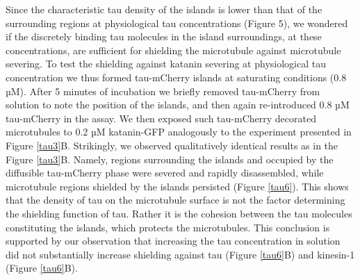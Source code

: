  Since the characteristic tau density of the islands is lower than that of the surrounding regions at physiological tau concentrations (Figure 5), we wondered if the discretely binding tau molecules in the island surroundings, at these concentrations, are sufficient for shielding the microtubule against microtubule severing. To test the shielding against katanin severing at physiological tau concentration we thus formed tau-mCherry islands at saturating conditions (0.8 µM). After 5 minutes of incubation we briefly removed tau-mCherry from solution to note the position of the islands, and then again re-introduced 0.8 µM tau-mCherry in the assay. We then exposed such tau-mCherry decorated microtubules to 0.2 µM katanin-GFP analogously to the experiment presented in Figure \ref{tau3}B. Strikingly, we observed qualitatively identical results as in the Figure \ref{tau3}B. Namely, regions surrounding the islands and occupied by the diffusible tau-mCherry phase were severed and rapidly disassembled, while microtubule regions shielded by the islands persisted (Figure \ref{tau6}). This shows that the density of tau on the microtubule surface is not the factor determining the shielding function of tau. Rather it is the cohesion between the tau molecules constituting the islands, which protects the microtubules. This conclusion is supported by our observation that increasing the tau concentration in solution did not substantially increase shielding against tau (Figure \ref{tau6}B) and kinesin-1 (Figure \ref{tau6}B). 

